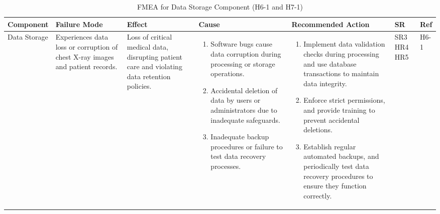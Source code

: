\documentclass{article}
\begin{document}
\begin{landscape}
    \begin{table}[ht]
    \centering
    \caption{FMEA for Data Storage Component (H6-1 and H7-1)}
    \renewcommand{\arraystretch}{1.1}
    {
    \setlength{\tabcolsep}{2pt}
    \begin{tabular}{|p{2.5cm}|p{2.5cm}|p{3cm}|p{5cm}|p{6cm}|p{1cm}|p{1cm}|}
    \hline
    \textbf{Component} & \textbf{Failure Mode} & \textbf{Effect} & \textbf{Cause} & \textbf{Recommended Action} & \textbf{SR} & \textbf{Ref} \\
    \hline

    Data Storage
     & Experiences data loss or corruption of chest X-ray images and patient records.
     & Loss of critical medical data, disrupting patient care and violating data retention policies.
     &
     \begin{enumerate}[leftmargin=*, label={\alph*.}, itemsep=1pt]
         \item Software bugs cause data corruption during processing or storage operations.
         \item Accidental deletion of data by users or administrators due to inadequate safeguards.
         \item Inadequate backup procedures or failure to test data recovery processes.
     \end{enumerate}
     &
     \begin{enumerate}[leftmargin=*, label={\alph*.}, itemsep=1pt]
         \item Implement data validation checks during processing and use database transactions to maintain data integrity.
         \item Enforce strict permissions, and provide training to prevent accidental deletions.
         \item Establish regular automated backups, and periodically test data recovery procedures to ensure they function correctly.
     \end{enumerate}
     & SR3 \newline HR4 \newline HR5 & H6-1 \\ \hline


\end{tabular}}
\end{table}
\end{landscape}
\end{document}
